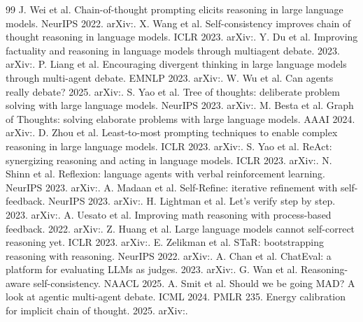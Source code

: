 \documentclass[11pt,a4paper]{article}
\theoremstyle{plain}
\theoremstyle{definition}
\theoremstyle{remark}
\begin{document}
\begin{thebibliography}{99}
 J. Wei et al. Chain-of-thought prompting elicits reasoning in large language models. NeurIPS 2022. arXiv:.
 X. Wang et al. Self-consistency improves chain of thought reasoning in language models. ICLR 2023. arXiv:.
 Y. Du et al. Improving factuality and reasoning in language models through multiagent debate. 2023. arXiv:.
 P. Liang et al. Encouraging divergent thinking in large language models through multi-agent debate. EMNLP 2023. arXiv:.
 W. Wu et al. Can agents really debate? 2025. arXiv:.
 S. Yao et al. Tree of thoughts: deliberate problem solving with large language models. NeurIPS 2023. arXiv:.
 M. Besta et al. Graph of Thoughts: solving elaborate problems with large language models. AAAI 2024. arXiv:.
 D. Zhou et al. Least-to-most prompting techniques to enable complex reasoning in large language models. ICLR 2023. arXiv:.
 S. Yao et al. ReAct: synergizing reasoning and acting in language models. ICLR 2023. arXiv:.
 N. Shinn et al. Reflexion: language agents with verbal reinforcement learning. NeurIPS 2023. arXiv:.
 A. Madaan et al. Self-Refine: iterative refinement with self-feedback. NeurIPS 2023. arXiv:.
 H. Lightman et al. Let's verify step by step. 2023. arXiv:.
 A. Uesato et al. Improving math reasoning with process-based feedback. 2022. arXiv:.
 Z. Huang et al. Large language models cannot self-correct reasoning yet. ICLR 2023. arXiv:.
 E. Zelikman et al. STaR: bootstrapping reasoning with reasoning. NeurIPS 2022. arXiv:.
 A. Chan et al. ChatEval: a platform for evaluating LLMs as judges. 2023. arXiv:.
 G. Wan et al. Reasoning-aware self-consistency. NAACL 2025.
 A. Smit et al. Should we be going MAD? A look at agentic multi-agent debate. ICML 2024. PMLR 235.
 Energy calibration for implicit chain of thought. 2025. arXiv:.


\end{thebibliography}
\end{document}
